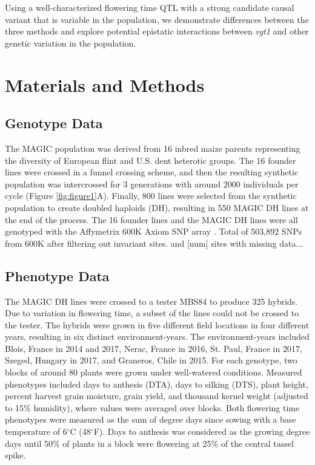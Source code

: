 \documentclass[article,9pt,twocolumn,twoside]{rilabRxiv}
\begin{document}
Using a well-characterized flowering time QTL with a strong candidate causal variant that is variable in the population, we demonstrate differences between the three methods and explore potential epistatic interactions between \emph{vgt1} and other genetic variation in the population.
\section{Materials and Methods}
\label{sec:materials:methods}
\subsection{Genotype Data}
The MAGIC population was derived from 16 inbred maize parents representing the
 diversity of European flint and U.S. dent heterotic groups. The 16 founder lines were crossed in a funnel crossing scheme, and then the resulting synthetic population was intercrossed for 3 generations with around 2000 individuals per cycle (Figure \ref{fig:figure1}A). Finally, 800 lines were selected from the synthetic population to create doubled haploids (DH), resulting in 550 MAGIC DH lines at the end of the process. The 16 founder lines and the MAGIC DH lines were all genotyped with the Affymetrix 600K Axiom SNP array \citep{RN13}. %
Total of 503,892 SNPs from 600K after filtering out invariant sites.  and [num] sites with missing data...

\subsection{Phenotype Data}
The MAGIC DH lines were crossed to a tester MBS84 to produce 325 hybrids. Due to variation in flowering time, a subset of the lines could not be crossed to the tester. The hybrids were grown in five different field locations in four different years, resulting in six distinct environment-years. The environment-years included Blois, France in 2014 and 2017, Nerac, France in 2016, St. Paul, France in 2017, Szeged, Hungary in 2017, and Graneros, Chile in 2015. For each genotype, two blocks of around 80 plants were grown under well-watered conditions. Measured phenotypes included days to anthesis (DTA), days to silking (DTS), plant height, percent harvest grain moisture, grain yield, and thousand kernel weight (adjusted to 15\% humidity), where values were averaged over blocks. Both flowering time phenotypes were measured as the sum of degree days since sowing with a base temperature of 6$^{\circ}$C (48$^{\circ}$F). Days to anthesis was considered as the growing degree days until 50\% of plants in a block were flowering at 25\% of the central tassel spike.
\end{document}
